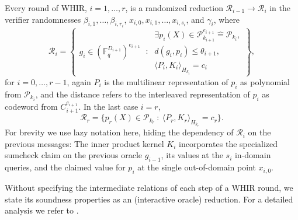 Every round of WHIR, $i=1,\ldots, r$, is a randomized reduction $\mathcal R_{i-1}\longrightarrow \mathcal R_i$ in the verifier randomnesses $\beta_{i,1},\ldots,\beta_{i,r_i}$, $x_{i,0},x_{i,1},\ldots, x_{i,s_i}$, and $\gamma_i$, where 
\begin{equation}
\label{e:WHIR:round:relation}
\mathcal R_i = \left\{
\begin{matrix}
g_i\in (\mathbb F_q^{D_{i+1}})^{e_{i+1}}
\end{matrix}
\::\:
\begin{matrix}
\exists p_i(X)\in \mathscr P_{k_{i+1}}^{e_{i+1}} \hat = \mathscr P_{k_i}, 
\\
d(g_i,p_i)\leq \theta_{i+1},
\\
\langle P_i, K_i\rangle_{H_{k_i}} = c_i 
\end{matrix}
\right\},
\end{equation} 
for $i=0,\ldots, r-1$, again $P_i$ is the multilinear representation of $p_i$ as polynomial from $\mathscr P_{k_i}$, and the distance refers to the interleaved representation of $p_i$ as codeword from $C_{i+1}^{e_{i+1}}$. 
In the last case $i=r$,
\begin{equation}
\label{e:WHIR:last:relation}
\mathcal R_r = \big\{
p_r(X)\in \mathscr P_{k_r} 
\::\:
\langle P_r, K_r\rangle_{H_{k_r}} = c_r 
\big\}.
\end{equation} 
For brevity we use lazy notation here, hiding the dependency of $\mathcal R_i$ on the previous messages:
The inner product kernel $K_i$ incorporates the specialized sumcheck claim on the previous oracle $g_{i-1}$, its values at the $s_i$ in-domain queries, and the claimed value for $p_i$ at the single out-of-domain point $x_{i,0}$.

%
Without specifying the intermediate relations of each step of a WHIR round, we state its soundness properties as an (interactive oracle) reduction.
For a detailed analysis we refer to \cite[Section 6.4]{Basefold:LDR}.


